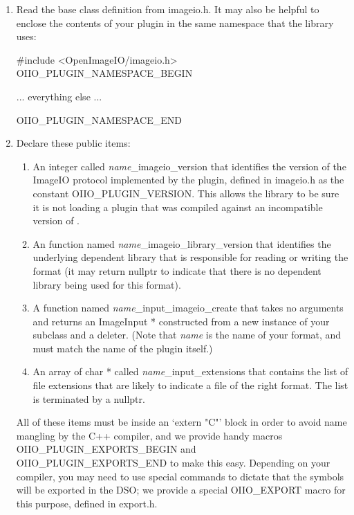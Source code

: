 \begin{enumerate}
\item Read the base class definition from {\fn imageio.h}.  It may also
  be helpful to enclose the contents of your plugin in the same
  namespace that the \product library uses:

  \begin{code}
    #include <OpenImageIO/imageio.h>
    OIIO_PLUGIN_NAMESPACE_BEGIN

    ... everything else ...

    OIIO_PLUGIN_NAMESPACE_END
  \end{code}

\item Declare these public items:

  \begin{enumerate}
    \item An integer called \emph{name}{\cf _imageio_version} that identifies
      the version of the ImageIO protocol implemented by the plugin,
      defined in {\fn imageio.h} as the constant {\cf OIIO_PLUGIN_VERSION}.
      This allows the library to be sure it is not loading a plugin
      that was compiled against an incompatible version of \product.
    \item An function named \emph{name}{\cf _imageio_library_version} that identifies
      the underlying dependent library that is responsible for reading or
      writing the format (it may return {\cf nullptr} to indicate that there is
      no dependent library being used for this format).
    \item A function named \emph{name}{\cf _input_imageio_create} that
      takes no arguments and returns an {\cf ImageInput *}
      constructed from a new instance of your \ImageInput subclass and a
      deleter. (Note that \emph{name} is the name of your format,
      and must match the name of the plugin itself.)
    \item An array of {\cf char *} called \emph{name}{\cf _input_extensions}
      that contains the list of file extensions that are likely to indicate
      a file of the right format.  The list is terminated by a {\cf nullptr}.
  \end{enumerate}

  All of these items must be inside an `{\cf extern "C"}' block in order
  to avoid name mangling by the C++ compiler, and we provide handy
  macros {\cf OIIO_PLUGIN_EXPORTS_BEGIN} and {\cf OIIO_PLUGIN_EXPORTS_END}
  to make this easy.  Depending on your
  compiler, you may need to use special commands to dictate that the
  symbols will be exported in the DSO; we provide a special {\cf
  OIIO_EXPORT} macro for this purpose, defined in {\fn export.h}.


\end{enumerate}
